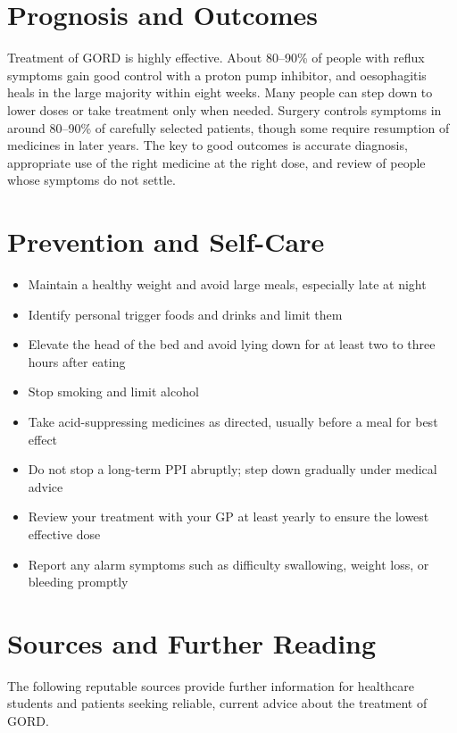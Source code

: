 \section*{Prognosis and Outcomes}
Treatment of GORD is highly effective. About 80--90\% of people with reflux symptoms gain good control with a proton pump inhibitor, and oesophagitis heals in the large majority within eight weeks. Many people can step down to lower doses or take treatment only when needed. Surgery controls symptoms in around 80--90\% of carefully selected patients, though some require resumption of medicines in later years. The key to good outcomes is accurate diagnosis, appropriate use of the right medicine at the right dose, and review of people whose symptoms do not settle.

\section*{Prevention and Self-Care}
\begin{itemize}
    \item Maintain a healthy weight and avoid large meals, especially late at night
    \item Identify personal trigger foods and drinks and limit them
    \item Elevate the head of the bed and avoid lying down for at least two to three hours after eating
    \item Stop smoking and limit alcohol
    \item Take acid-suppressing medicines as directed, usually before a meal for best effect
    \item Do not stop a long-term PPI abruptly; step down gradually under medical advice
    \item Review your treatment with your GP at least yearly to ensure the lowest effective dose
    \item Report any alarm symptoms such as difficulty swallowing, weight loss, or bleeding promptly
\end{itemize}

\section*{Sources and Further Reading}
The following reputable sources provide further information for healthcare students and patients seeking reliable, current advice about the treatment of GORD.

